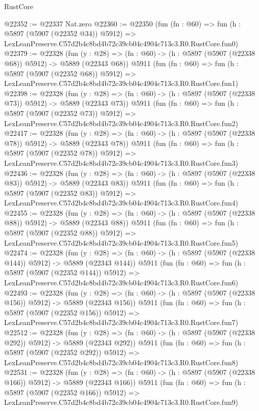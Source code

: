 \begin{lexlean}{RustCore}
\begin{coremodule}
@22352 := @22337 Nat.zero
@22360 := @22350
    (fun (fn : @60) =>
    fun (h : @5897 (@5907 (@22352 @34)) @5912) =>
    LexLeanPreserve.C57d2b4c8bd4b72c39cb04c4904c713c3.R0.RustCore.fun0)
@22379 := @22328
    (fun (y : @28) => (fn : @60) -> (h : @5897 (@5907 (@22338 @68)) @5912) -> @5889 (@22343 @68))
    @5911
    (fun (fn : @60) =>
    fun (h : @5897 (@5907 (@22352 @68)) @5912) =>
    LexLeanPreserve.C57d2b4c8bd4b72c39cb04c4904c713c3.R0.RustCore.fun1)
@22398 := @22328
    (fun (y : @28) => (fn : @60) -> (h : @5897 (@5907 (@22338 @73)) @5912) -> @5889 (@22343 @73))
    @5911
    (fun (fn : @60) =>
    fun (h : @5897 (@5907 (@22352 @73)) @5912) =>
    LexLeanPreserve.C57d2b4c8bd4b72c39cb04c4904c713c3.R0.RustCore.fun2)
@22417 := @22328
    (fun (y : @28) => (fn : @60) -> (h : @5897 (@5907 (@22338 @78)) @5912) -> @5889 (@22343 @78))
    @5911
    (fun (fn : @60) =>
    fun (h : @5897 (@5907 (@22352 @78)) @5912) =>
    LexLeanPreserve.C57d2b4c8bd4b72c39cb04c4904c713c3.R0.RustCore.fun3)
@22436 := @22328
    (fun (y : @28) => (fn : @60) -> (h : @5897 (@5907 (@22338 @83)) @5912) -> @5889 (@22343 @83))
    @5911
    (fun (fn : @60) =>
    fun (h : @5897 (@5907 (@22352 @83)) @5912) =>
    LexLeanPreserve.C57d2b4c8bd4b72c39cb04c4904c713c3.R0.RustCore.fun4)
@22455 := @22328
    (fun (y : @28) => (fn : @60) -> (h : @5897 (@5907 (@22338 @88)) @5912) -> @5889 (@22343 @88))
    @5911
    (fun (fn : @60) =>
    fun (h : @5897 (@5907 (@22352 @88)) @5912) =>
    LexLeanPreserve.C57d2b4c8bd4b72c39cb04c4904c713c3.R0.RustCore.fun5)
@22474 := @22328
    (fun (y : @28) => (fn : @60) -> (h : @5897 (@5907 (@22338 @144)) @5912) -> @5889 (@22343 @144))
    @5911
    (fun (fn : @60) =>
    fun (h : @5897 (@5907 (@22352 @144)) @5912) =>
    LexLeanPreserve.C57d2b4c8bd4b72c39cb04c4904c713c3.R0.RustCore.fun6)
@22493 := @22328
    (fun (y : @28) => (fn : @60) -> (h : @5897 (@5907 (@22338 @156)) @5912) -> @5889 (@22343 @156))
    @5911
    (fun (fn : @60) =>
    fun (h : @5897 (@5907 (@22352 @156)) @5912) =>
    LexLeanPreserve.C57d2b4c8bd4b72c39cb04c4904c713c3.R0.RustCore.fun7)
@22512 := @22328
    (fun (y : @28) => (fn : @60) -> (h : @5897 (@5907 (@22338 @292)) @5912) -> @5889 (@22343 @292))
    @5911
    (fun (fn : @60) =>
    fun (h : @5897 (@5907 (@22352 @292)) @5912) =>
    LexLeanPreserve.C57d2b4c8bd4b72c39cb04c4904c713c3.R0.RustCore.fun8)
@22531 := @22328
    (fun (y : @28) => (fn : @60) -> (h : @5897 (@5907 (@22338 @166)) @5912) -> @5889 (@22343 @166))
    @5911
    (fun (fn : @60) =>
    fun (h : @5897 (@5907 (@22352 @166)) @5912) =>
    LexLeanPreserve.C57d2b4c8bd4b72c39cb04c4904c713c3.R0.RustCore.fun9)

\end{coremodule}
\end{lexlean}
